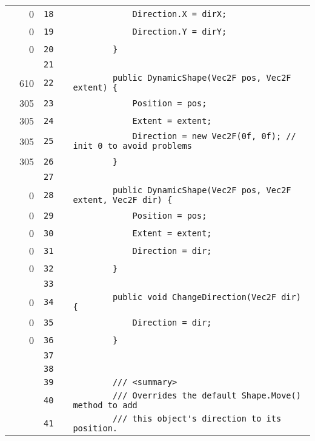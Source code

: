 \documentclass[a4paper,landscape,10pt]{article}
\begin{document}
\begin{longtable}[l]{lrrll}
\cellcolor{red} & 0 & \verb~18~ & & \verb~            Direction.X = dirX;~\\
\cellcolor{red} & 0 & \verb~19~ & & \verb~            Direction.Y = dirY;~\\
\cellcolor{red} & 0 & \verb~20~ & & \verb~        }~\\
\cellcolor{gray} &  & \verb~21~ & & \verb~~\\
\cellcolor{green} & 610 & \verb~22~ & & \verb~        public DynamicShape(Vec2F pos, Vec2F extent) {~\\
\cellcolor{green} & 305 & \verb~23~ & & \verb~            Position = pos;~\\
\cellcolor{green} & 305 & \verb~24~ & & \verb~            Extent = extent;~\\
\cellcolor{green} & 305 & \verb~25~ & & \verb~            Direction = new Vec2F(0f, 0f); // init 0 to avoid problems~\\
\cellcolor{green} & 305 & \verb~26~ & & \verb~        }~\\
\cellcolor{gray} &  & \verb~27~ & & \verb~~\\
\cellcolor{red} & 0 & \verb~28~ & & \verb~        public DynamicShape(Vec2F pos, Vec2F extent, Vec2F dir) {~\\
\cellcolor{red} & 0 & \verb~29~ & & \verb~            Position = pos;~\\
\cellcolor{red} & 0 & \verb~30~ & & \verb~            Extent = extent;~\\
\cellcolor{red} & 0 & \verb~31~ & & \verb~            Direction = dir;~\\
\cellcolor{red} & 0 & \verb~32~ & & \verb~        }~\\
\cellcolor{gray} &  & \verb~33~ & & \verb~~\\
\cellcolor{red} & 0 & \verb~34~ & & \verb~        public void ChangeDirection(Vec2F dir) {~\\
\cellcolor{red} & 0 & \verb~35~ & & \verb~            Direction = dir;~\\
\cellcolor{red} & 0 & \verb~36~ & & \verb~        }~\\
\cellcolor{gray} &  & \verb~37~ & & \verb~~\\
\cellcolor{gray} &  & \verb~38~ & & \verb~~\\
\cellcolor{gray} &  & \verb~39~ & & \verb~        /// <summary>~\\
\cellcolor{gray} &  & \verb~40~ & & \verb~        /// Overrides the default Shape.Move() method to add~\\
\cellcolor{gray} &  & \verb~41~ & & \verb~        /// this object's direction to its position.~\\

\end{longtable}
\end{document}

